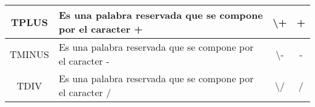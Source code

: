 \documentclass[12pt,a4paper,landscape]{article}
\theoremstyle{mytheor}
\begin{document}
\begin{longtable}[c]{|c|c|c|c|}
TPLUS        & \multicolumn{1}{l|}{Es una palabra reservada que se compone por el caracter +}                                                                                                                                                                                                                                                                                                                              & \textbackslash{}+                                                   & +                                                                                                                                                                                                                                                \\ \hline
TMINUS       & \multicolumn{1}{l|}{Es una palabra reservada que se compone por el caracter -}                                                                                                                                                                                                                                                                                                                              & \textbackslash{}-                                                   & -                                                                                                                                                                                                                                                \\ \hline
TDIV         & \multicolumn{1}{l|}{Es una palabra reservada que se compone por el caracter /}                                                                                                                                                                                                                                                                                                                              & \textbackslash{}/                                                   & /                                                                                                                                                                                                                                                \\ \hline


\end{longtable}
\end{document}
